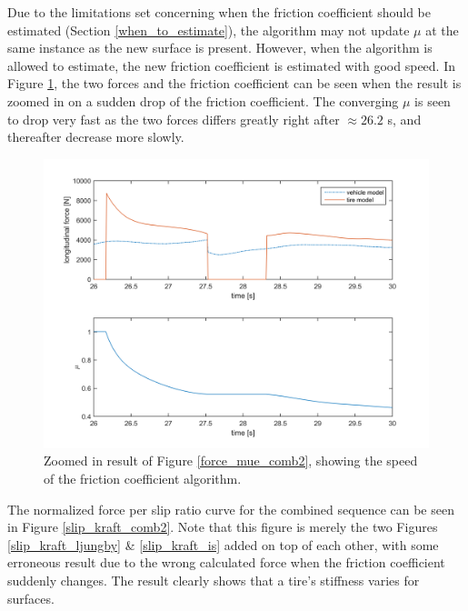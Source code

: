Due to the limitations set concerning when the friction coefficient should be estimated (Section \ref{when_to_estimate}), the algorithm may not update $ \mu $ at the same instance as the new surface is present. However, when the algorithm is allowed to estimate, the new friction coefficient is estimated with good speed. In Figure \ref{force_mue_comb2_zoom}, the two forces and the friction coefficient can be seen when the result is zoomed in on a sudden drop of the friction coefficient. The converging $ \mu $ is seen to drop very fast as the two forces differs greatly right after $ \approx 26.2 $ s, and thereafter decrease more slowly. 

\begin{figure}[h]
	\centering
	\includegraphics[width=1.0\textwidth]{Pictures/force_mue_comb2_zoom}
	\caption {Zoomed in result of Figure \ref{force_mue_comb2}, showing the speed of the friction coefficient algorithm.}
	\label{force_mue_comb2_zoom}
\end{figure}

The normalized force per slip ratio curve for the combined sequence can be seen in Figure \ref{slip_kraft_comb2}. Note that this figure is merely the two Figures \ref{slip_kraft_ljungby} \& \ref{slip_kraft_is} added on top of each other, with some erroneous result due to the wrong calculated force when the friction coefficient suddenly changes. The result clearly shows that a tire's stiffness varies for surfaces.

